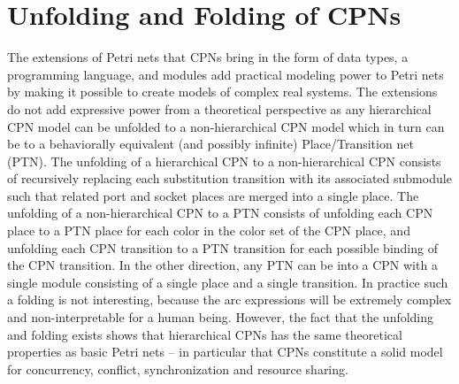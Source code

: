 \section{Unfolding and Folding of CPNs}

The extensions of Petri nets that CPNs bring in the form of data
types, a programming language, and modules add practical modeling
power to Petri nets by making it possible to create models of complex
real systems. The extensions do not add expressive power from a
theoretical perspective as any hierarchical CPN model can be unfolded
to a non-hierarchical CPN model which in turn can be 
to a behaviorally equivalent (and possibly infinite) Place/Transition
net (PTN). The unfolding of a hierarchical CPN to a non-hierarchical CPN
consists of recursively replacing each substitution transition with
its associated submodule such that related port and socket places are
merged into a single place. The unfolding of a non-hierarchical CPN to
a PTN consists of unfolding each CPN place to a PTN place for each
color in the color set of the CPN place, and unfolding each CPN
transition to a PTN transition for each possible binding of the CPN
transition. In the other direction, any PTN can be 
into a CPN with a single module consisting of a single place and a
single transition. In practice such a folding is not interesting,
because the arc expressions will be extremely complex and
non-interpretable for a human being. However, the fact that the
unfolding and folding exists shows that hierarchical CPNs has the same
theoretical properties as basic Petri nets -- in particular that CPNs
constitute a solid model for concurrency, conflict, synchronization
and resource sharing.




